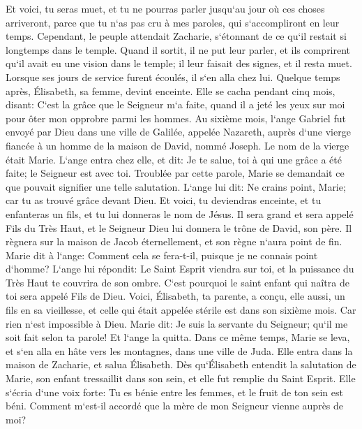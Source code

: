 \verse Et voici, tu seras muet, et tu ne pourras parler jusqu`au jour où ces choses arriveront, parce que tu n`as pas cru à mes paroles, qui s`accompliront en leur temps. 
\verse Cependant, le peuple attendait Zacharie, s`étonnant de ce qu`il restait si longtemps dans le temple. 
\verse Quand il sortit, il ne put leur parler, et ils comprirent qu`il avait eu une vision dans le temple; il leur faisait des signes, et il resta muet. 
\verse Lorsque ses jours de service furent écoulés, il s`en alla chez lui. 
\verse Quelque temps après, Élisabeth, sa femme, devint enceinte. Elle se cacha pendant cinq mois, disant: 
\verse C`est la grâce que le Seigneur m`a faite, quand il a jeté les yeux sur moi pour ôter mon opprobre parmi les hommes. 
\verse Au sixième mois, l`ange Gabriel fut envoyé par Dieu dans une ville de Galilée, appelée Nazareth, 
\verse auprès d`une vierge fiancée à un homme de la maison de David, nommé Joseph. Le nom de la vierge était Marie. 
\verse L`ange entra chez elle, et dit: Je te salue, toi à qui une grâce a été faite; le Seigneur est avec toi. 
\verse Troublée par cette parole, Marie se demandait ce que pouvait signifier une telle salutation. 
\verse L`ange lui dit: Ne crains point, Marie; car tu as trouvé grâce devant Dieu. 
\verse Et voici, tu deviendras enceinte, et tu enfanteras un fils, et tu lui donneras le nom de Jésus. 
\verse Il sera grand et sera appelé Fils du Très Haut, et le Seigneur Dieu lui donnera le trône de David, son père. 
\verse Il règnera sur la maison de Jacob éternellement, et son règne n`aura point de fin. 
\verse Marie dit à l`ange: Comment cela se fera-t-il, puisque je ne connais point d`homme? 
\verse L`ange lui répondit: Le Saint Esprit viendra sur toi, et la puissance du Très Haut te couvrira de son ombre. C`est pourquoi le saint enfant qui naîtra de toi sera appelé Fils de Dieu. 
\verse Voici, Élisabeth, ta parente, a conçu, elle aussi, un fils en sa vieillesse, et celle qui était appelée stérile est dans son sixième mois. 
\verse Car rien n`est impossible à Dieu. 
\verse Marie dit: Je suis la servante du Seigneur; qu`il me soit fait selon ta parole! Et l`ange la quitta. 
\verse Dans ce même temps, Marie se leva, et s`en alla en hâte vers les montagnes, dans une ville de Juda. 
\verse Elle entra dans la maison de Zacharie, et salua Élisabeth. 
\verse Dès qu`Élisabeth entendit la salutation de Marie, son enfant tressaillit dans son sein, et elle fut remplie du Saint Esprit. 
\verse Elle s`écria d`une voix forte: Tu es bénie entre les femmes, et le fruit de ton sein est béni. 
\verse Comment m`est-il accordé que la mère de mon Seigneur vienne auprès de moi? 
